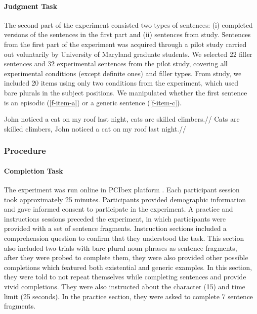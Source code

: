\documentclass[
  10pt,
  letterpaper,
  DIV=11,
  numbers=noendperiod]{scrartcl}
\let\oldparagraph\paragraph
\renewcommand{\paragraph}[1]{\oldparagraph{#1}\mbox{}}
\begin{document}
\hypertarget{judgment-task}{%
\paragraph{Judgment Task}\label{judgment-task}}

The second part of the experiment consisted two types of sentences: (i)
completed versions of the sentences in the first part and (ii) sentences
from \textcite{FrazierEtAl2007} study. Sentences from the first part of
the experiment was acquired through a pilot study carried out
voluntarily by University of Maryland graduate students. We selected 22
filler sentences and 32 experimental sentences from the pilot study,
covering all experimental conditions (except definite ones) and filler
types. From \textcite{FrazierEtAl2007} study, we included 20 items using
only two conditions from the experiment, which used bare plurals in the
subject positions. We manipulated whether the first sentence is an
episodic (\ref{f-item-a}) or a generic sentence (\ref{f-item-c}).


\pex \a\label{f-item-a} \begingl \gla John noticed a cat on my roof last
night, cats are skilled climbers.// \endgl  \a\label{f-item-c}
\begingl \gla Cats are skilled climbers, John noticed a cat on my roof
last night.// \endgl  \xe

\hypertarget{procedure}{%
\subsubsection{Procedure}\label{procedure}}

\hypertarget{completion-task-1}{%
\paragraph{Completion Task}\label{completion-task-1}}

The experiment was run online in PCIbex platform
\autocite{Drummond2013,ZehrSchwarz2018}. Each participant session took
approximately 25 minutes. Participants provided demographic information
and gave informed consent to participate in the experiment. A practice
and instructions sessions preceded the experiment, in which participants
were provided with a set of sentence fragments. Instruction sections
included a comprehension question to confirm that they understood the
task. This section also included two trials with bare plural noun
phrases as sentence fragments, after they were probed to complete them,
they were also provided other possible completions which featured both
existential and generic examples. In this section, they were told to not
repeat themselves while completing sentences and provide vivid
completions. They were also instructed about the character (15) and time
limit (25 seconds). In the practice section, they were asked to complete
7 sentence fragments.
\end{document}
